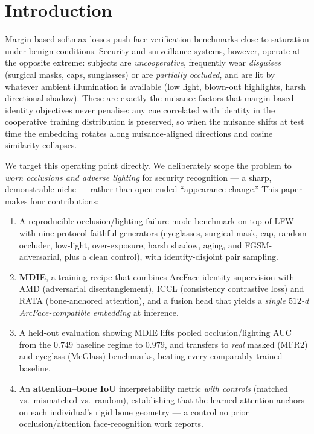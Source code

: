\documentclass[10pt,conference]{IEEEtran}
\begin{document}
\section{Introduction}
\label{sec:intro}

Margin-based softmax losses
\cite{deng2019arcface,wang2018cosface,schroff2015facenet,liu2017sphereface,zhang2019adacos}
push face-verification benchmarks close to saturation under benign conditions.
Security and surveillance systems, however, operate at the opposite extreme:
subjects are \emph{uncooperative}, frequently wear \emph{disguises} (surgical
masks, caps, sunglasses) or are \emph{partially occluded}, and are lit by
whatever ambient illumination is available (low light, blown-out highlights,
harsh directional shadow). These are exactly the nuisance factors that
margin-based identity objectives never penalise: any cue correlated with
identity in the cooperative training distribution is preserved, so when the
nuisance shifts at test time the embedding rotates along nuisance-aligned
directions and cosine similarity collapses.

We target this operating point directly. We deliberately scope the problem to
\emph{worn occlusions and adverse lighting} for security recognition --- a
sharp, demonstrable niche --- rather than open-ended ``appearance change.''
This paper makes four contributions:
\begin{enumerate}
\item A reproducible occlusion/lighting failure-mode benchmark on top of LFW
      with nine protocol-faithful generators (eyeglasses, surgical mask,
      cap, random occluder, low-light, over-exposure, harsh shadow, aging,
      and FGSM-adversarial, plus a clean control), with identity-disjoint
      pair sampling.
\item \textbf{MDIE}, a training recipe that combines ArcFace identity
      supervision with AMD (adversarial disentanglement), ICCL
      (consistency contrastive loss) and RATA (bone-anchored attention),
      and a fusion head that yields a \emph{single $512$-d
      ArcFace-compatible embedding} at inference.
\item A held-out evaluation showing MDIE lifts pooled occlusion/lighting AUC
      from the $0.749$ baseline regime to $0.979$, and transfers to
      \emph{real} masked (MFR2) and eyeglass (MeGlass) benchmarks, beating
      every comparably-trained baseline.
\item An \textbf{attention--bone IoU} interpretability metric \emph{with
      controls} (matched vs.\ mismatched vs.\ random), establishing that the
      learned attention anchors on each individual's rigid bone geometry ---
      a control no prior occlusion/attention face-recognition work reports.
\end{enumerate}
\end{document}
